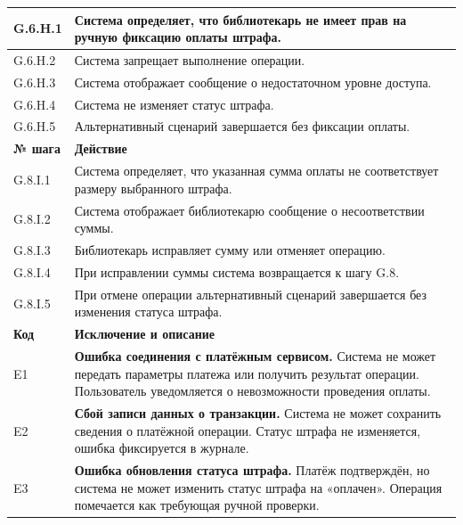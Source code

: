 \documentclass[12pt,a4paper]{article}
\begin{document}
\begin{xltabular}{\textwidth}{
				|>{\raggedright\arraybackslash}p{2.7cm}
				|>{\raggedright\arraybackslash}X|
			}
			G.6.H.1 & Система определяет, что библиотекарь не имеет прав на ручную
			фиксацию оплаты штрафа. \\
			\hline
			G.6.H.2 & Система запрещает выполнение операции. \\
			\hline
			G.6.H.3 & Система отображает сообщение о недостаточном уровне доступа. \\
			\hline
			G.6.H.4 & Система не изменяет статус штрафа. \\
			\hline
			G.6.H.5 & Альтернативный сценарий завершается без фиксации оплаты. \\
			\hline
			
			
			\textbf{№ шага} & \textbf{Действие} \\
			\hline
			
			G.8.I.1 & Система определяет, что указанная сумма оплаты не соответствует
			размеру выбранного штрафа. \\
			\hline
			G.8.I.2 & Система отображает библиотекарю сообщение о несоответствии суммы. \\
			\hline
			G.8.I.3 & Библиотекарь исправляет сумму или отменяет операцию. \\
			\hline
			G.8.I.4 & При исправлении суммы система возвращается к шагу G.8. \\
			\hline
			G.8.I.5 & При отмене операции альтернативный сценарий завершается без
			изменения статуса штрафа. \\
			\hline
			
			
			\textbf{Код} & \textbf{Исключение и описание} \\
			\hline
			
			E1 &
			\textbf{Ошибка соединения с платёжным сервисом.}
			Система не может передать параметры платежа или получить результат
			операции. Пользователь уведомляется о невозможности проведения
			оплаты. \\
			\hline
			
			E2 &
			\textbf{Сбой записи данных о транзакции.}
			Система не может сохранить сведения о платёжной операции.
			Статус штрафа не изменяется, ошибка фиксируется в журнале. \\
			\hline
			
			E3 &
			\textbf{Ошибка обновления статуса штрафа.}
			Платёж подтверждён, но система не может изменить статус штрафа на
			«оплачен». Операция помечается как требующая ручной проверки. \\
			\hline
			

\end{xltabular}
\end{document}

